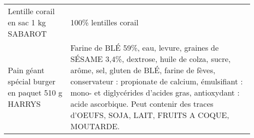\begin{longtable}{p{5cm}p{10cm}}
                                                                      Lentille corail en sac 1 kg SABAROT &                                                                                                                                                                                                                                                                                                                                                                                                                                                                                                                                                                                                                                                                                                                                                                                                                                                                                                                                                                                                                    100\% lentilles corail \\
                                                         Pain géant spécial burger en paquet 510 g HARRYS &                                                                                                                                                                                                                                                                                                                                                                                                                                                                                                                                                                                                                                                                                                    Farine de BLÉ 59\%, eau, levure, graines de SÉSAME 3,4\%, dextrose, huile de colza, sucre, arôme, sel, gluten de BLÉ, farine de fèves, conservateur : propionate de calcium, émulsifiant : mono- et diglycérides d'acides gras, antioxydant : acide ascorbique. Peut contenir des traces d'OEUFS, SOJA, LAIT, FRUITS A COQUE, MOUTARDE. \\

\end{longtable}
